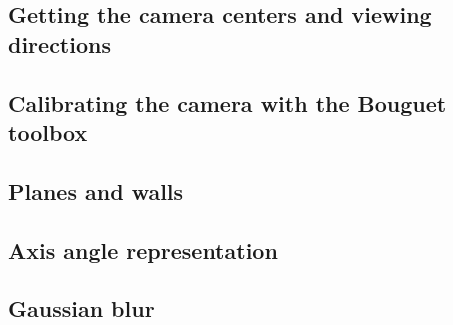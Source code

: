 \subsection{Getting the camera centers and viewing directions}
%  
\subsection{Calibrating the camera with the Bouguet toolbox}
%  
%  
%  
%  
%  
 \subsection{Planes and walls}
%  
\subsection{Axis angle representation}
%  
\subsection{Gaussian blur}
